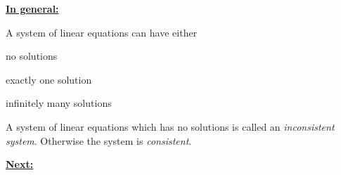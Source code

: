 \newpage

\underline{\bf In general:}

\vskip 3mm

A system of linear equations can have either
\bitem
\item no solutions\\[-4mm]
\item exactly one solution\\[-4mm]
\item infinitely many solutions
\eitem

\vskip 10mm

\begin{cbox}[Definition]
A system of linear equations which has no solutions is called an \emph{inconsistent system}. 
Otherwise the system is \emph{consistent}.
\end{cbox}


\newpage





\underline{\bf Next:}


